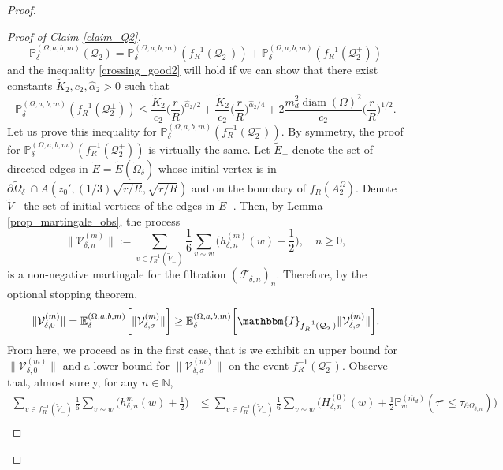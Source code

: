 \documentclass{article}
\newcommand{\PP}{{\mathbb{P}}}
\newcommand{\EE}{{\mathbb{E}}}
\theoremstyle{definition}
\theoremstyle{remark}
\theoremstyle{remark}
\begin{document}
\begin{proof}
\begin{proof}[Proof of Claim \ref{claim_Q2}]
\begin{equation*}
    \PP_{\delta}^{(\Omega,a,b,m)}(\mathcal{Q}_{2}) = \PP_{\delta}^{(\Omega,a,b,m)}(f_R^{-1}(\mathcal{Q}_{2}^{-})) + \PP_{\delta}^{(\Omega,a,b,m)}(f_R^{-1}(\mathcal{Q}_{2}^{+}))
\end{equation*}
and the inequality \eqref{crossing_good2} will hold if we can show that there exist constants $\tilde K_2, c_2, \hat \alpha_2 >0$ such that
\begin{equation*}
    \PP_{\delta}^{(\Omega,a,b,m)}(f_R^{-1}(\mathcal{Q}_{2}^{\pm})) \leq  \frac{\tilde K_2}{c_2}\bigg(\frac{r}{R}\bigg)^{\hat \alpha_2/2}+ \frac{\tilde K_2}{c_2}\bigg(\frac{r}{R} \bigg)^{\hat \alpha_2/4} + 2\frac{\overline{m}_d^{2}\operatorname{diam}(\Omega)^2}{c_2}\bigg(\frac{r}{R}\bigg)^{1/2}.
\end{equation*}
Let us prove this inequality for $\PP_{\delta}^{(\Omega,a,b,m)}(f_{R}^{-1}(\mathcal{Q}_{2}^{-}))$. By symmetry, the proof for $\PP_{\delta}^{(\Omega,a,b,m)}(f_R^{-1}(\mathcal{Q}_{2}^{+}))$ is virtually the same. Let $\tilde E_{-}$ denote the set of directed edges in $\tilde E = \tilde E(\tilde \Omega_{\delta})$ whose initial vertex is in $\partial \tilde \Omega_{\delta}^{-} \cap A(z_0', (1/3)\sqrt{r/R}, \sqrt{r/R})$ and on the boundary of $f_R(A_2^{\Omega})$. Denote $\tilde V_{-}$ the set of initial vertices of the edges in $\tilde E_{-}$. Then, by Lemma \ref{prop_martingale_obs}, the process
\begin{equation*}
    \| \mathcal{V}_{\delta,n}^{(m)} \|:= \sum_{v \in f_R^{-1}(\tilde V_{-})} \frac{1}{6} \sum_{v \sim w} \bigg( h_{\delta, n}^{(m)}(w) + \frac{1}{2} \bigg), \quad n \geq 0,
\end{equation*}
is a non-negative martingale for the filtration $(\mathcal{F}_{\delta,n})_n$. Therefore, by the optional stopping theorem,
\begin{equation*}
     \| \mathcal{V}_{\delta,0}^{(m)} \| = \EE_{\delta}^{(\Omega,a,b,m)}\bigg[ \| \mathcal{V}_{\delta,\sigma}^{(m)} \| \bigg] \geq \EE_{\delta}^{(\Omega,a,b,m)} \bigg[ \mathbbm{I}_{f_R^{-1}(\mathcal{Q}_{2}^{-})}\| \mathcal{V}_{\delta,\sigma}^{(m)} \| \bigg].
\end{equation*}
From here, we proceed as in the first case, that is we exhibit an upper bound for $\| \mathcal{V}_{\delta,0}^{(m)} \|$ and a lower bound for $\| \mathcal{V}_{\delta,\sigma}^{(m)} \|$ on the event $f_{R}^{-1}(\mathcal{Q}_{2}^{-})$. Observe that, almost surely, for any $n \in \mathbb{N}$,
\begin{align*}
    \sum_{v \in f_R^{-1}(\tilde V_{-})} \frac{1}{6} \sum_{v \sim w} \bigg( h_{\delta, n}^m(w) + \frac{1}{2} \bigg)&\leq \sum_{v \in f_R^{-1}(\tilde V_{-})} \frac{1}{6} \sum_{v \sim w} \bigg( H_{\delta, n}^{(0)}(w) + \frac{1}{2}\PP_{w}^{(\overline{m}_d)}(\tau^{\star}\leq \tau_{\partial \Omega_{\delta,n}}) \bigg) \\

\end{align*}
\end{proof}
\end{proof}
\end{document}
